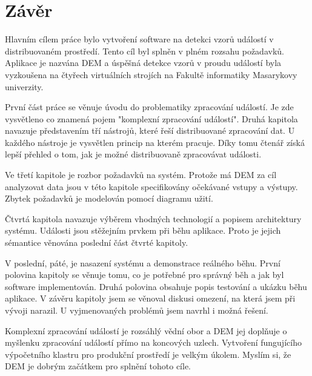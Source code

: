 \documentclass[
  digital, %
  table,   %
  nolof,     %
  nolot,     %
  oneside, %
  nocover,
  monochrome,
  12pt
]{fithesis3}
\begin{document}
\chapter{Závěr}
Hlavním cílem práce bylo vytvoření software na detekci vzorů událostí v distribuovaném prostředí. Tento cíl byl splněn v plném rozsahu požadavků. Aplikace je nazvána DEM a úspěšná detekce vzorů v proudu událostí byla vyzkoušena na čtyřech virtuálních strojích na Fakultě informatiky Masarykovy univerzity.

První část práce se věnuje úvodu do problematiky zpracování událostí. Je zde vysvětleno co znamená pojem "komplexní zpracování událostí". Druhá kapitola navazuje představením tří nástrojů, které řeší distribuované zpracování dat. U každého nástroje je vysvětlen princip na kterém pracuje. Díky tomu čtenář získá lepší přehled o tom, jak je možné distribuovaně zpracovávat události.

Ve třetí kapitole je rozbor požadavků na systém. Protože má DEM za cíl analyzovat data jsou v této kapitole specifikovány očekávané vstupy a výstupy. Zbytek požadavků je modelován pomocí diagramu užití.

Čtvrtá kapitola navazuje výběrem vhodných technologií a popisem architektury systému. Události jsou stěžejním prvkem při běhu aplikace. Proto je jejich sémantice věnována poslední část čtvrté kapitoly.

V poslední, páté, je nasazení systému a demonstrace reálného běhu. První polovina kapitoly se věnuje tomu, co je potřebné pro správný běh a jak byl software implementován. Druhá polovina obsahuje popis testování a ukázku běhu aplikace. V závěru kapitoly jsem se věnoval diskusi omezení, na která jsem při vývoji narazil. U vyjmenovaných problémů jsem navrhl i možná řešení.

Komplexní zpracování událostí je rozsáhlý vědní obor a DEM jej doplňuje o myšlenku zpracování událostí přímo na koncových uzlech. Vytvoření fungujícího výpočetního klastru pro produkční prostředí je velkým úkolem. Myslím si, že DEM je dobrým začátkem pro splnění tohoto cíle.
\end{document}
